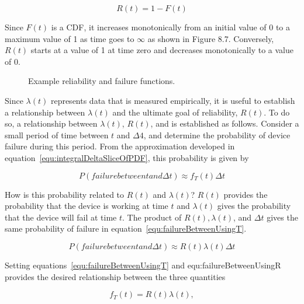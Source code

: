 \begin{equation}
\label{equ:integralDeltaSliceOfPDF}
R(t) = 1 - F(t)
\end{equation}


Since $F(t)$ is a CDF, it increases monotonically from an initial
value of 0 to a maximum value of 1 as time goes to $\infty$ as shown in Figure
8.7. Conversely, $R(t)$ starts at a value of 1 at time zero and
decreases monotonically to a value of 0.


\begin{figure}
\caption{Example reliability and failure functions.}
\label{figure:reliabilityAndFailure}
\end{figure}

Since $\lambda(t)$ represents data that is measured empirically, it is
useful to establish a relationship between $\lambda(t)$ and the ultimate
goal of reliability, $R(t)$. To do so, a relationship between
$\lambda(t)$, $R(t)$, and  is
established as follows. Consider a small period of time between $t$
and $\Delta 4$, and determine the
probability of device failure during this period. From the approximation
developed in 
equation~\ref{equ:integralDeltaSliceOfPDF}, this probability is given by

\begin{equation}
\label{equ:failureBetweenUsingT}
P(failure between t and \Delta t) \approx f_T(t) \Delta t
\end{equation}

How is this probability related to $R(t)$ and $\lambda(t)$?
$R(t)$ provides the probability that the device is working at time $t$
and $\lambda(t)$ gives the probability that the device will fail
at time $t$. The product of $R(t), \lambda(t)$, and $\Delta t$ gives
the same probability of failure in equation~\ref{equ:failureBetweenUsingT}.

\begin{equation}
\label{equ:failureBetweenUsingR}
P(failure between t and \Delta t) \approx R(t) \lambda(t) \Delta t
\end{equation}

Setting equations~\ref{equ:failureBetweenUsingT} and  {equ:failureBetweenUsingR} 
provides the desired relationship between the three quantities

\begin{equation}
\label{equ:failureBetweenUsingR}
f_T(t) = R(t) \lambda(t) ,
\end{equation}

